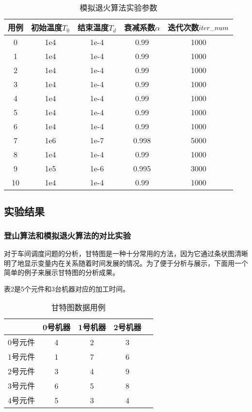 \documentclass[UTF8]{ctexart}
\begin{document}
\begin{table} 
	\centering
	\caption{模拟退火算法实验参数}
	\begin{tabular}{ccccc} %
		
		\toprule %
		用例 & 初始温度\(T_0\) & 结束温度\(T_d\) & 衰减系数\(\alpha\) &
		迭代次数\(\small iter\_num\) \\
		\hline %
		0 & 1e4 & 1e-4 & 0.99 & 1000 \\
		1 & 1e4 & 1e-4 & 0.99 & 1000 \\
		2 & 1e4 & 1e-4 & 0.99 & 1000 \\
		3 & 1e4 & 1e-4 & 0.99 & 1000 \\
		4 & 1e4 & 1e-4 & 0.99 & 1000 \\
		5 & 1e4 & 1e-4 & 0.99 & 1000 \\
		6 & 1e4 & 1e-4 & 0.99 & 1000 \\
		7 & 1e6 & 1e-7 & 0.998 & 5000 \\
		8 & 1e4 & 1e-4 & 0.99 & 1000 \\
		9 & 1e5 & 1e-6 & 0.995 & 3000 \\
		10 & 1e4 & 1e-4 & 0.99 & 1000 \\
		\bottomrule %
	\end{tabular}
	
\end{table}

\subsection{实验结果}
\subsubsection{登山算法和模拟退火算法的对比实验}
对于车间调度问题的分析，甘特图是一种十分常用的方法，因为它通过条状图清晰明了地显示变量内在关系随着时间发展的情况。为了便于分析与展示，下面用一个简单的例子来展示甘特图的分析成果。

表2是5个元件和3台机器对应的加工时间。

\begin{table} 
	\centering
	\caption{甘特图数据用例}
	\begin{tabular}{ccccc} %
		
		\toprule %
		 & 0号机器 & 1号机器 & 2号机器 \\
		\hline %
		0号元件 & 4 & 2 & 3 \\
		1号元件 & 1 & 7 & 6 \\
		2号元件 & 3 & 4 & 9 \\
		3号元件 & 6 & 5 & 8 \\
		4号元件 & 5 & 3 & 4 \\
		\bottomrule %
	\end{tabular}
	
\end{table}
\end{document}

